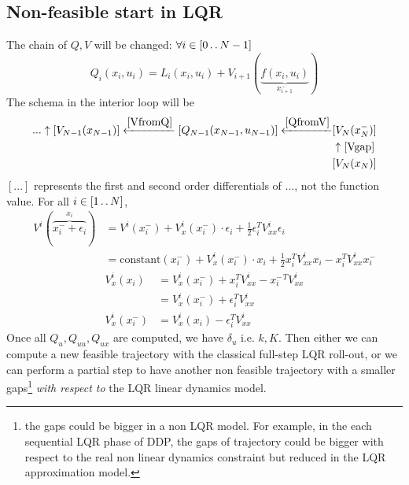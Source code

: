 \documentclass{report}
\newcommand{\twodots}{\mathinner {\ldotp \ldotp}}
\begin{document}
\subsection{Non-feasible start in LQR}
\label{NFLQR}
The chain of $Q, V$ will be changed: $\forall i \in [0 \twodots N-1]$
\begin{equation}
Q_i(x_i,u_i) = L_i(x_i,u_i) + V_{i+1}(\underbrace{f(x_i,u_i)}_{x_{i+1}^-})
\end{equation}
The schema in the interior loop will be
\begin{align*}
... \uparrow[V_{N-1}(x_{N-1})] \xleftarrow{\ref{VfromQ}} [Q_{N-1}(x_{N-1}, u_{N-1})] \xleftarrow{\ref{QfromV}} &[V_{N}(x_N^-)] \\
					&\uparrow \ref{Vgap} \\
					&[V_N(x_N)]
\end{align*}
$[...]$ represents the first and second order differentials of $...$, not the function value.
For all $i \in [1 \twodots N]$,
\begin{equation}
\begin{split}
V^i(\overbrace{x_i^- + \epsilon_i}^{x_i}) &= V^i(x_i^-) + V^i_x(x_i^-) \cdot \epsilon_i
+\frac{1}{2} \epsilon_i^T V_{xx}^i \epsilon_i \\
 	&= \text{constant}(x_i^-) + V_x^i(x_i^-) \cdot x_i + \frac{1}{2}x_i^T V_{xx}^i x_i - x_i^T V_{xx}^i x_i^-
\end{split}
\end{equation}
\begin{equation}
\label{Vgap}
\begin{split}
V_x^i(x_i) &= V_x^i(x_i^-) + x_i^T V_{xx}^i - {x_i^-}^T V_{xx}^i \\
					&= V_x^i(x_i^-) + \epsilon_i^T V_{xx}^i \\
V_x^i(x_i^-) &= V_x^i(x_i) - \epsilon_i^T V_{xx}^i 
\end{split}
\end{equation}
Once all $Q_u, Q_{uu}, Q_{ux}$ are computed, we have $\delta_u$ i.e. $k, K$. Then either we can compute a new feasible trajectory with the classical full-step LQR roll-out, or we can perform a partial step to have another non feasible trajectory with a smaller gaps\footnote{the gaps could be bigger in a non LQR model. For example, in the each sequential LQR phase of DDP, the gaps of trajectory could be bigger with respect to the real non linear dynamics constraint but reduced in the LQR approximation model.} \emph{with respect to} the LQR linear dynamics model.
\end{document}
